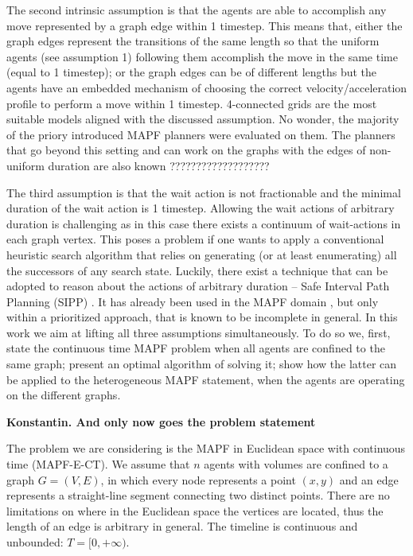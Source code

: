 The second intrinsic assumption is that the agents are able to accomplish any move represented by a graph edge within 1 timestep. This means that, either the graph edges represent the transitions of the same length so that the uniform agents (see assumption 1) following them accomplish the move in the same time (equal to 1 timestep); or the graph edges can be of different lengths but the agents have an embedded mechanism of choosing the correct velocity/acceleration profile to perform a move within 1 timestep. 4-connected grids are the most suitable models aligned with the discussed assumption. No wonder, the majority of the priory introduced MAPF planners were evaluated on them. The planners that go beyond this setting and can work on the graphs with the edges of non-uniform duration are also known ???????????????????

The third assumption is that the wait action is not fractionable and the minimal duration of the wait action is 1 timestep. Allowing the wait actions of arbitrary duration is challenging as in this case there exists a continuum of wait-actions in each graph vertex. This poses a problem if one wants to apply a conventional heuristic search algorithm that relies on generating (or at least enumerating) all the successors of any search state. Luckily, there exist a technique that can be adopted to reason about the actions of arbitrary duration -- Safe Interval Path Planning (SIPP) \cite{}. It has already been used in the MAPF domain \cite{}, but only within a prioritized approach, that is known to be incomplete in general. 
In this work we aim at lifting all three assumptions simultaneously. To do so we, first, state the continuous time MAPF problem when all agents are confined to the same graph; present an optimal algorithm of solving it; show how the latter can be applied to the heterogeneous MAPF statement, when the agents are operating on the different graphs. 

\textbf{Konstantin. And only now goes the problem statement}

The problem we are considering is the MAPF in Euclidean space with continuous time (MAPF-E-CT). We assume that $n$ agents with volumes are confined to a graph $G=(V,E)$, in which every node represents a point $(x, y)$ and an edge represents a straight-line segment connecting two distinct points. There are no limitations on where in the Euclidean space the vertices are located, thus the length of an edge is arbitrary in general. The timeline is continuous and unbounded: $T=[0, +\infty)$.

